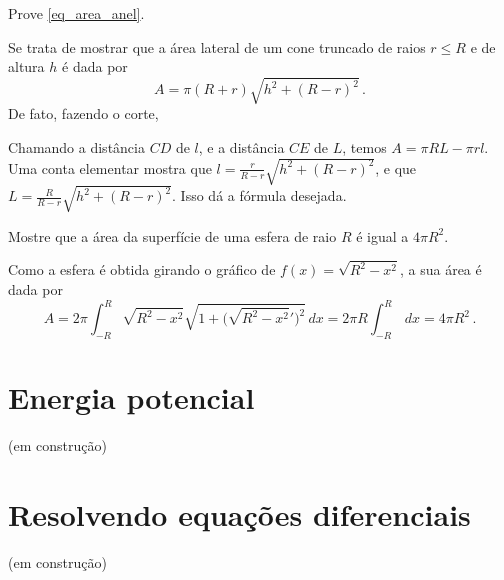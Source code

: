 \begin{exo}
Prove \eqref{eq_area_anel}.
\begin{sol}
Se trata de mostrar que 
a área lateral de um cone truncado de raios $r\leq R$ 
e de altura $h$ é dada por 
$$
A=\pi (R+r)\sqrt{h^2+(R-r)^2}\,.
$$
De fato, fazendo o corte,
\begin{center}
\begin{bmlimage}\end{bmlimage}
\end{center}
Chamando a distância $CD$ de $l$, e a distância $CE$ de $L$, temos
$A=\pi R L-\pi rl$. Uma conta elementar mostra que
$l=\frac{r}{R-r}\sqrt{h^2+(R-r)^2}$, e que 
$L=\frac{R}{R-r}\sqrt{h^2+(R-r)^2}$.
Isso dá a fórmula desejada.
\end{sol}
\end{exo}

\begin{exo}
Mostre que a área da superfície de uma esfera de raio $R$ é igual a $4\pi R^2$.
\begin{sol}
Como a esfera é obtida girando o gráfico de
$f(x)=\sqrt{R^2-x^2}$, a sua área é dada por 
$$
A=2\pi\int_{-R}^R\sqrt{R^2-x^2}\sqrt{1+\bigl(\sqrt{R^2-x^2}'\bigr)^2}\,dx
=2\pi R\int_{-R}^R\,dx= 4\pi R^2\,.
$$
\end{sol}
\end{exo}

\section{Energia potencial}
(em construção)
\section{Resolvendo equações diferenciais}
(em construção)
